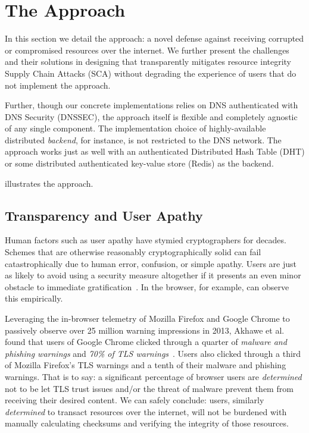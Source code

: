 \section{The \SYSTEM{} Approach} \label{sec:approach}

In this section we detail the \SYSTEM{} approach: a novel defense against
receiving corrupted or compromised resources over the internet. We further
present the challenges and their solutions in designing \SYSTEM{} that
transparently mitigates resource integrity Supply Chain Attacks (SCA) without
degrading the experience of users that do not implement the \SYSTEM{} approach.

Further, though our concrete implementations relies on DNS authenticated with
DNS Security (DNSSEC), the approach itself is flexible and completely agnostic
of any single component. The implementation choice of highly-available
distributed \emph{backend}, for instance, is not restricted to the DNS network.
The approach works just as well with an authenticated Distributed Hash Table
(DHT) or some distributed authenticated key-value store (\eg Redis) as the
backend.

 
illustrates the \SYSTEM{} approach.

\subsection{Transparency and User Apathy}

Human factors such as user apathy have stymied cryptographers for decades.
Schemes that are otherwise reasonably cryptographically solid can fail
catastrophically due to human error, confusion, or simple apathy. Users are just
as likely to avoid using a security measure altogether if it presents an even
minor obstacle to immediate gratification~\cite{Clickthrough, PGPBad}. In the
browser, for example, can observe this empirically.

Leveraging the in-browser telemetry of Mozilla Firefox and Google Chrome to
passively observe over 25 million warning impressions in 2013, Akhawe et al.
found that users of Google Chrome clicked through a quarter of \emph{malware and
phishing warnings} and \emph{70\% of TLS warnings}~\cite{Clickthrough}. Users
also clicked through a third of Mozilla Firefox's TLS warnings and a tenth of
their malware and phishing warnings. That is to say: a significant percentage of
browser users are \emph{determined} not to be let TLS trust issues and/or the
threat of malware prevent them from receiving their desired content. We can
safely conclude: users, similarly \emph{determined} to transact resources over
the internet, will not be burdened with manually calculating checksums and
verifying the integrity of those resources.

